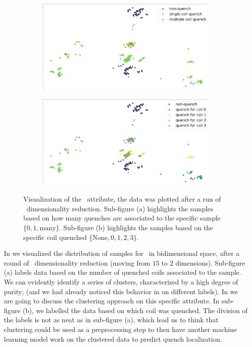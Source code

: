 \begin{figure}[!ht]
	\centering
	\begin{subfigure}{0.6\linewidth}
		\centering
		\includegraphics[width=\linewidth]{img/quench_dist_qlp/single_vs_multiple_An.png}
		\subcaption{}
	\end{subfigure}
	\begin{subfigure}{0.6\linewidth}
		\centering
		\includegraphics[width=\linewidth]{img/quench_dist_qlp_an.png}
		\subcaption{}
	\end{subfigure}
	\caption{Visualization of the \an\ attribute, the data was plotted after a run of \pca\
		dimensionality reduction. Sub-figure (a) highlights the samples based on how many quenches
		are associated to the specific sample $\{0, 1, \text{many}\}$. Sub-figure (b) highlights the
		samples based on the specific coil quenched $\{\text{None}, 0, 1, 2, 3\}$.}\label{fig:an-coilq-dist}
\end{figure}

In  we visualized the distribution of samples for \an\ in
bidimensional space, after a round of \pca\ dimensionality reduction (moving from $15$ to $2$
dimensions). Sub-figure (a) labels data based on the number of quenched coils associated to the
sample. We can evidently identify a series of clusters, characterized by a high degree of purity;
(and we had already noticed this behavior in \Cref{sec:an} on different labels). In
\Cref{sec:qlp-cluster} we are going to discuss the clustering approach on this specific attribute.
In sub-figure (b), we labelled the data based on which coil was quenched. The division of the labels
is not as neat as in sub-figure (a), which lead us to think that clustering could be used as a
preprocessing step to then have another machine learning model work on the clustered data to predict
quench localization.

